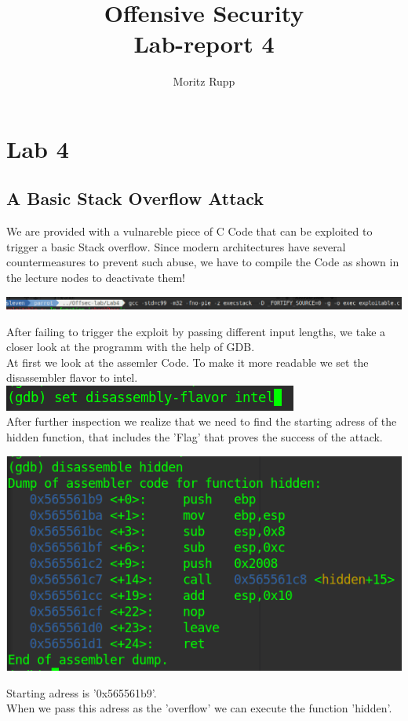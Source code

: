 \documentclass[a4paper,10pt]{article}
\title{Offensive Security\\Lab-report 4}
\author{Moritz Rupp}
\begin{document}
\maketitle

\begin{abstract}

\end{abstract}
\newpage
\section{Lab 4}
\subsection{A Basic Stack Overflow Attack}
We are provided with a vulnareble piece of C Code that can be exploited to trigger a basic Stack overflow. Since modern architectures have several countermeasures to prevent such abuse, we have to compile the Code as shown in the lecture nodes to deactivate them!
\begin{center}
 \includegraphics[scale=0.3]{gcc.png}
\end{center} 
After failing to trigger the exploit by passing different input lengths, we take a closer look at the programm with the help of GDB.\\
At first we look at the assemler Code. To make it more readable we set the disassembler flavor to intel. \includegraphics[scale=0.4]{intelfalvor.png}\\
After further inspection we realize that we need to find the starting adress of the hidden function, that includes the 'Flag' that proves the success of the attack.
\begin{center}
 \includegraphics[scale=0.5]{hidden.png}
\end{center}
Starting adress is '0x565561b9'.\\
When we pass this adress as the 'overflow' we can execute the function 'hidden'.
\end{document}
